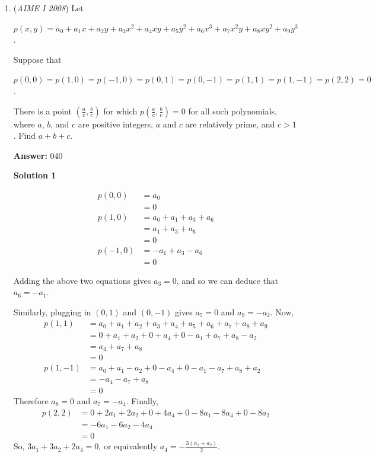 \begin{enumerate}
 \href{https://mathproblemsolvingskills.wordpress.com/}{MathProblemSolvingSkills.com}

 


 


	\item (\textit{AIME I 2008}) Let


 $p(x,y) = a_0 + a_1x + a_2y + a_3x^2 + a_4xy + a_5y^2 + a_6x^3 + a_7x^2y + a_8xy^2 + a_9y^3$.


 Suppose that 


 $p(0,0) = p(1,0) = p( - 1,0) = p(0,1) = p(0, - 1) = p(1,1) = p(1, - 1) = p(2,2) = 0$.


 There is a point $\left(\frac {a}{c},\frac {b}{c}\right)$ for which $p\left(\frac {a}{c},\frac {b}{c}\right) = 0$ for all such polynomials, where $a$, $b$, and $c$ are positive integers, $a$ and $c$ are relatively prime, and $c > 1$.  Find $a + b + c$.


 
 \textbf{Answer: }040



\textbf{Solution 1}


 \begin{align*} p(0,0) &= a_0 \\ &= 0 \\ p(1,0) &= a_0 + a_1 + a_3 + a_6 \\ &= a_1 + a_3 + a_6 \\ &= 0 \\ p(-1,0) &= -a_1 + a_3 - a_6 \\ &= 0 \end{align*}


 Adding the above two equations gives $a_3 = 0$, and so we can deduce that $a_6 = -a_1$.

 Similarly, plugging in $(0,1)$ and $(0,-1)$ gives $a_5 = 0$ and $a_9 = -a_2$. Now,
 \begin{align*} p(1,1) &= a_0 + a_1 + a_2 + a_3 + a_4 + a_5 + a_6 + a_7 + a_8 + a_9 \\ &= 0 + a_1 + a_2 + 0 + a_4 + 0 - a_1 + a_7 + a_8 - a_2 \\ &= a_4 + a_7 + a_8 \\ &= 0 \\ p(1,-1) &= a_0 + a_1 - a_2 + 0 - a_4 + 0 - a_1 - a_7 + a_8 + a_2 \\ &= -a_4 - a_7 + a_8 \\ &= 0 \end{align*}
Therefore $a_8 = 0$ and $a_7 = -a_4$. Finally,
 \begin{align*} p(2,2) &= 0 + 2a_1 + 2a_2 + 0 + 4a_4 + 0 - 8a_1 - 8a_4 +0 - 8a_2 \\ &= -6 a_1 - 6 a_2 - 4 a_4 \\ &= 0 \end{align*}
So, $3a_1 + 3a_2 + 2a_4 = 0$, or equivalently $a_4 = -\frac{3(a_1 + a_2)}{2}$.


\end{enumerate}
